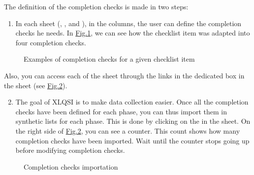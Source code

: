 \documentclass[letterpaper,10pt,english]{sphinxmanual}
\begin{document}
The definition of the completion checks is made in two steps:
\begin{enumerate}
\item {} 
In each  sheet (, ,  and ), in the  columns, the user can define the completion checks he needs. In \hyperref[\detokenize{create_data_entry:define-completion-check}]{Fig.\@ \ref{\detokenize{create_data_entry:define-completion-check}}}, we can see how the checklist item  was adapted into four completion checks.

\end{enumerate}

\begin{figure}[htbp]
\centering
\capstart

\noindent{}
\caption{Examples of completion checks for a given checklist item}\label{\detokenize{create_data_entry:define-completion-check}}\end{figure}

Also, you can access each of the sheet through the links in the dedicated box in the   sheet (see \hyperref[\detokenize{create_data_entry:click-completion}]{Fig.\@ \ref{\detokenize{create_data_entry:click-completion}}}).
\begin{enumerate}
\setcounter{enumi}{1}
\item {} 
The goal of XLQSI is to make data collection easier. Once all the completion checks have been defined for each phase, you can thus import them in synthetic lists for each phase. This is done by clicking on the  in the  sheet. On the right side of \hyperref[\detokenize{create_data_entry:click-completion}]{Fig.\@ \ref{\detokenize{create_data_entry:click-completion}}}, you can see a counter. This count shows how many completion checks have been imported. Wait until the counter stops going up before modifying completion checks.

\end{enumerate}

\begin{figure}[htbp]
\centering
\capstart

\noindent{}
\caption{Completion checks importation}\label{\detokenize{create_data_entry:click-completion}}\end{figure}
\end{document}
